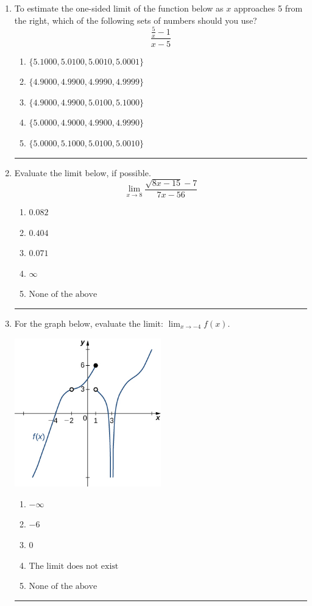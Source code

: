 \documentclass[14pt]{extbook}
\newcommand{\litem}[1]{\item#1\hspace*{-1cm}\rule{\textwidth}{0.4pt}}
\begin{document}
\begin{enumerate}
{\begin{enumerate}[label=\Alph*.]
\end{enumerate} }
\litem{
To estimate the one-sided limit of the function below as $x$ approaches 5 from the right, which of the following sets of numbers should you use?\[ \frac{\frac{5}{x} - 1}{x - 5} \]\begin{enumerate}[label=\Alph*.]
\item \( \{ 5.1000, 5.0100, 5.0010, 5.0001 \} \)
\item \( \{ 4.9000, 4.9900, 4.9990, 4.9999 \} \)
\item \( \{ 4.9000, 4.9900, 5.0100, 5.1000 \} \)
\item \( \{ 5.0000, 4.9000, 4.9900, 4.9990 \} \)
\item \( \{ 5.0000, 5.1000, 5.0100, 5.0010 \} \)

\end{enumerate} }
\litem{
Evaluate the limit below, if possible.\[ \lim_{x \rightarrow 8} \frac{\sqrt{8x - 15} - 7}{7x - 56} \]\begin{enumerate}[label=\Alph*.]
\item \( 0.082 \)
\item \( 0.404 \)
\item \( 0.071 \)
\item \( \infty \)
\item \( \text{None of the above} \)

\end{enumerate} }
\litem{
For the graph below, evaluate the limit: $ \displaystyle \lim_{x \rightarrow -4} f(x)$.
\begin{center}
    \includegraphics[width=0.5\textwidth]{../Figures/evaluateLimitGraphicallyCopyB.png}
\end{center}
\begin{enumerate}[label=\Alph*.]
\item \( -\infty \)
\item \( -6 \)
\item \( 0 \)
\item \( \text{The limit does not exist} \)
\item \( \text{None of the above} \)


\end{enumerate}}
\end{enumerate}
\end{document}

